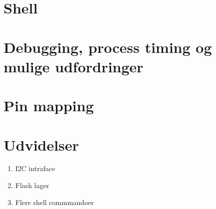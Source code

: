 \section{Shell}

\section{Debugging, process timing og mulige udfordringer}

\section{Pin mapping}


\section{Udvidelser}

\begin{enumerate}
	\item I2C intraface
	\item Flash lager
	\item Flere shell commmandoer
\end{enumerate}
